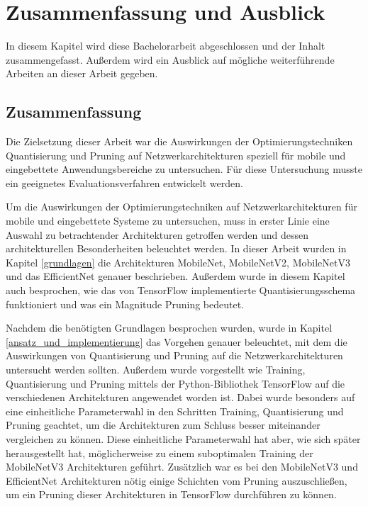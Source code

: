 \chapter{Zusammenfassung und Ausblick}
In diesem Kapitel wird diese Bachelorarbeit abgeschlossen und der Inhalt zusammengefasst. Außerdem wird ein Ausblick auf mögliche weiterführende Arbeiten an dieser Arbeit gegeben.



\section{Zusammenfassung}
Die Zielsetzung dieser Arbeit war die Auswirkungen der Optimierungstechniken Quantisierung und Pruning auf Netzwerkarchitekturen speziell für mobile und eingebettete Anwendungsbereiche zu untersuchen. Für diese Untersuchung musste ein geeignetes Evaluationsverfahren entwickelt werden.

Um die Auswirkungen der Optimierungstechniken auf Netzwerkarchitekturen für mobile und eingebettete Systeme zu untersuchen, muss in erster Linie eine Auswahl zu betrachtender Architekturen getroffen werden und dessen architekturellen Besonderheiten beleuchtet werden. In dieser Arbeit wurden in Kapitel \ref{grundlagen} die Architekturen MobileNet, MobileNetV2, MobileNetV3 und das EfficientNet genauer beschrieben. Außerdem wurde in diesem Kapitel auch besprochen, wie das von TensorFlow implementierte Quantisierungsschema funktioniert und was ein Magnitude Pruning bedeutet.

Nachdem die benötigten Grundlagen besprochen wurden, wurde in Kapitel \ref{ansatz_und_implementierung} das Vorgehen genauer beleuchtet, mit dem die Auswirkungen von Quantisierung und Pruning auf die Netzwerkarchitekturen untersucht werden sollten. Außerdem wurde vorgestellt wie Training, Quantisierung und Pruning mittels der Python-Bibliothek TensorFlow auf die verschiedenen Architekturen angewendet worden ist. Dabei wurde besonders auf eine einheitliche Parameterwahl in den Schritten Training, Quantisierung und Pruning geachtet, um die Architekturen zum Schluss besser miteinander vergleichen zu können. Diese einheitliche Parameterwahl hat aber, wie sich später herausgestellt hat, möglicherweise zu einem suboptimalen Training der MobileNetV3 Architekturen geführt. Zusätzlich war es bei den MobileNetV3 und EfficientNet Architekturen nötig einige Schichten vom Pruning auszuschließen, um ein Pruning dieser Architekturen in TensorFlow durchführen zu können.

